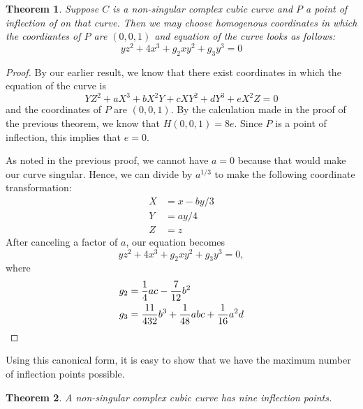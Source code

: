 \documentclass[12pt]{article}
\newtheorem{thm}{Theorem}
\begin{document}
\begin{thm}
Suppose $C$ is a non-singular complex cubic curve and $P$ a point
of inflection of on that curve.  Then we may choose homogenous 
coordinates in which the coordiantes of $P$ are $(0,0,1)$ and 
equation of the curve looks as follows:
\[
 y z^2 + 4 x^3 + g_2 x y^2 + g_3 y^3 = 0
\]
\end{thm}

\begin{proof}
By our earlier result, we know that there exist 
coordinates in which the equation of the curve is
\[
 Y Z^2 + a X^3 + b X^2 Y + c X Y^2 + d Y^3 + e X^2 Z = 0
\]
and the coordinates of $P$ are $(0,0,1)$.  By the
calculation made in the proof of the previous theorem,
we know that $H(0,0,1) = 8e$.  Since $P$ is a point
of inflection, this implies that $e = 0$.

As noted in the previous proof, we cannot have $a = 0$
because that would make our curve singular.  Hence,
we can divide by $a^{1/3}$ to make the following coordinate
transformation:
\begin{align*}
 X &= x - by/3 \\
 Y &= ay/4 \\
 Z &= z
\end{align*}
After canceling a factor of $a$, our equation becomes
\[
 y z^2 + 4 x^3 + g_2 x y^2 + g_3 y^3 = 0 ,
\]
where
\begin{align*}
 g_2 &= {1 \over 4} ac - {7 \over 12} b^2 \\
 g_3 &= {11 \over 432} b^3 + {1 \over 48} abc + {1 \over 16} a^2 d
\end{align*}
\end{proof}

Using this canonical form, it is easy to show that we
have the maximum number of inflection points possible.

\begin{thm}
A non-singular complex cubic curve has nine inflection points.
\end{thm}
\end{document}
